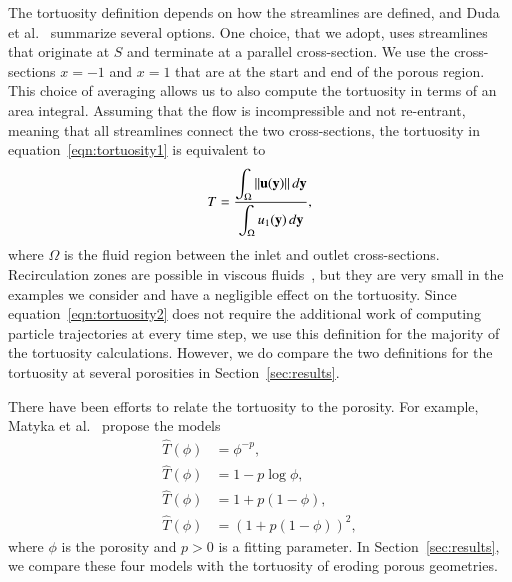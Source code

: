 \documentclass[preprint,10pt]{elsarticle}
\begin{document}
The tortuosity definition depends on how the streamlines are
defined, and Duda et al.~\cite{dud-koz-mat2011} summarize several
options. One choice, that we adopt, uses streamlines that originate at
$S$ and terminate at a parallel cross-section.  We use the
cross-sections $x=-1$ and $x=1$ that are at the start and end of the
porous region.  This choice of averaging allows us to also compute the
tortuosity in terms of an area integral.  Assuming that the flow is
incompressible and not re-entrant, meaning that all streamlines connect
the two cross-sections, the tortuosity in
equation~\eqref{eqn:tortuosity1} is equivalent to~\cite{dud-koz-mat2011}
\begin{align}
  T = \frac{\displaystyle\int_\Omega \|{\mathbf{u}}({\mathbf{y}})\|\, d{\mathbf{y}}}
           {\displaystyle\int_\Omega u_1({\mathbf{y}})\, d{\mathbf{y}}},
  \label{eqn:tortuosity2}
\end{align}
where $\Omega$ is the fluid region between the inlet and outlet
cross-sections.  Recirculation zones are possible in viscous
fluids~\cite{hig1985}, but they are very small in the examples we
consider and have a negligible effect on the tortuosity.  Since
equation~\eqref{eqn:tortuosity2} does not require the additional work of
computing particle trajectories at every time step, we use this
definition for the majority of the tortuosity calculations.  However, we
do compare the two definitions for the tortuosity at several porosities
in Section~\ref{sec:results}.

There have been efforts to relate the tortuosity to the porosity.  For
example, Matyka et al.~\cite{mat-kha-koz2008} propose the models
\begin{subequations}
  \label{eqn:tortuosityModels}
  \begin{align}
    \widehat{T}(\phi) &= \phi^{-p}, \\
    \widehat{T}(\phi) &= 1-p \log \phi, \\
    \widehat{T}(\phi) &= 1+p (1-\phi), \\
    \widehat{T}(\phi) &= (1+p (1-\phi))^2, 
  \end{align}
\end{subequations}
where $\phi$ is the porosity and $p>0$ is a fitting parameter.  In
Section~\ref{sec:results}, we compare these four models with the
tortuosity of eroding porous geometries.

\end{document}
